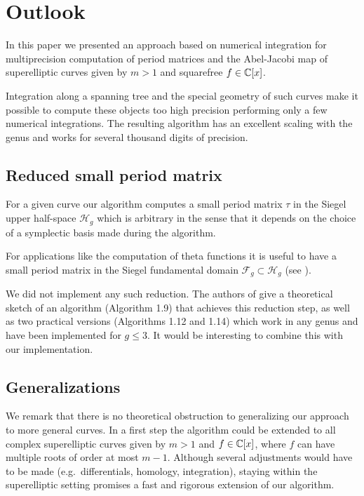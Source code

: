 \documentclass[main.tex]{subfiles}
\begin{document}
  \newpage

  \section{Outlook}\label{sec:outlook}

  In this paper we presented an approach based on numerical integration for
  multiprecision computation of period matrices and the Abel-Jacobi map of
  superelliptic curves given by $m > 1$ and squarefree $f \in \mathbb{C}[x]$.
 
  Integration along a spanning tree and the special geometry of such curves
  make it possible to compute these objects too high precision performing only
  a few numerical integrations. The resulting algorithm has an excellent
  scaling with the genus and works for several thousand digits of precision.

  \subsection{Reduced small period matrix}

   For a given curve our algorithm computes a small period matrix
   $\tau$ in the Siegel upper half-space $\mathcal{H}_g$ which is arbitrary
   in the sense that it depends on the choice of a symplectic basis made
   during the algorithm.
   
   For applications like the computation of theta functions it is useful to
   have a small period matrix in the Siegel fundamental domain $\mathcal{F}_g \subset
   \mathcal{H}_g$ (see \cite[\S 1.3]{PlaneQuarticsCM}).
  
   We did not implement any such reduction.
   The authors of \cite{PlaneQuarticsCM} give a theoretical sketch of
   an algorithm (Algorithm 1.9) that achieves this reduction step, as well as
   two practical versions (Algorithms 1.12 and 1.14) which work in any genus and have been implemented for $g
   \le 3$. It would be interesting to combine this with our implementation.
  
  \subsection{Generalizations}
  
  We remark that there is no theoretical obstruction to generalizing our
  approach to more general curves. In a first step the algorithm could be
  extended to all complex superelliptic curves given by $m > 1$ and $f \in
  \mathbb{C}[x]$, where $f$ can have multiple roots of order at most $m-1$.
  Although several adjustments would have to be made (e.g.\ differentials,
  homology, integration), staying within the superelliptic setting promises
  a fast and rigorous extension of our algorithm. 
  
\end{document}
